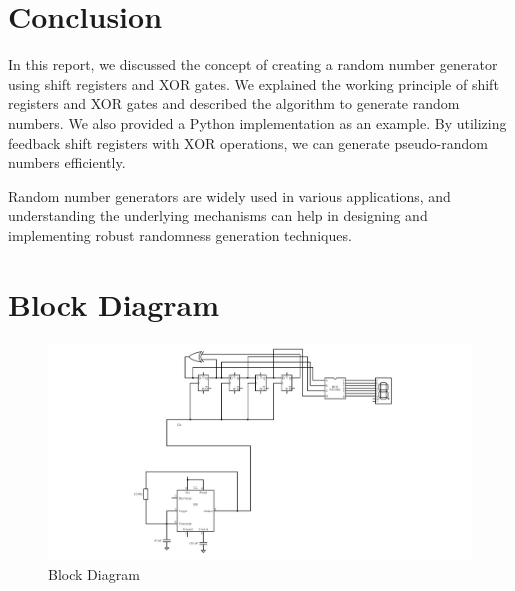 \documentclass{article}
\begin{document}
\section{Conclusion}

In this report, we discussed the concept of creating a random number generator using shift registers and XOR gates. We explained the working principle of shift registers and XOR gates and described the algorithm to generate random numbers. We also provided a Python implementation as an example. By utilizing feedback shift registers with XOR operations, we can generate pseudo-random numbers efficiently.

Random number generators are widely used in various applications, and understanding the underlying mechanisms can help in designing and implementing robust randomness generation techniques.

\section{Block Diagram}
\begin{figure}[ht]
        \centering
        \includegraphics[width=0.8\linewidth]{BlockDiagram.jpeg}
        \caption{Block Diagram}
        \label{fig:view}
\end{figure}
\end{document}
